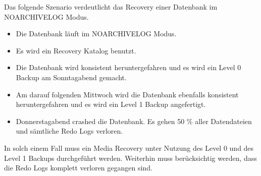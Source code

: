         Das folgende Szenario verdeutlicht das Recovery einer Datenbank im NOARCHIVELOG Modus.
        \begin{itemize}
          \item Die Datenbank l\"auft im NOARCHIVELOG Modus.
          \item Es wird ein Recovery Katalog benutzt.
          \item Die Datenbank wird konsistent heruntergefahren und es wird ein Level 0 Backup am Sonntagabend gemacht.
          \item Am darauf folgenden Mittwoch wird die Datenbank ebenfalls konsistent heruntergefahren und es wird ein Level 1 Backup angefertigt.
          \item Donnerstagabend crashed die Datenbank. Es gehen 50 \% aller Datendateien und s\"amtliche Redo Logs verloren.
        \end{itemize}
        In solch einem Fall muss ein Media Recovery unter Nutzung des Level 0 und des Level 1 Backups durchgef\"uhrt werden. Weiterhin muss ber\"ucksichtig werden, dass die Redo Logs komplett verloren gegangen sind.
